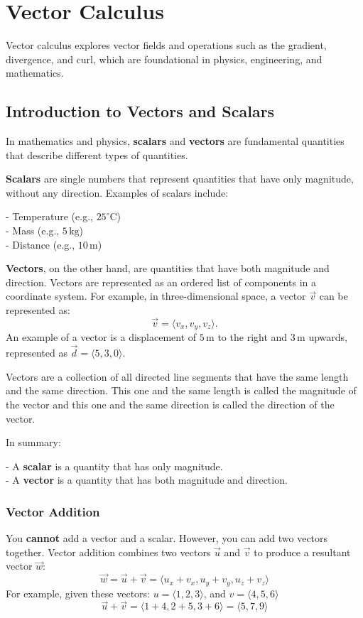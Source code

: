 \documentclass[a4paper,12pt,openany]{book}
\newcommand{\vcomponents}[4]{
    #1 = \langle #2, #3, #4 \rangle
}
\begin{document}
\chapter{Vector Calculus}
Vector calculus explores vector fields and operations such as the gradient, divergence, and curl, which are foundational in physics, engineering, and mathematics.

\section{Introduction to Vectors and Scalars}
In mathematics and physics, \textbf{scalars} and \textbf{vectors} are fundamental quantities that describe different types of quantities.

\textbf{Scalars} are single numbers that represent quantities that have only magnitude, without any direction. Examples of scalars include:

- Temperature (e.g., \(25^\circ \text{C}\))\\
- Mass (e.g., \(5 \, \text{kg}\))\\
- Distance (e.g., \(10 \, \text{m}\))

\textbf{Vectors}, on the other hand, are quantities that have both magnitude and direction. Vectors are represented as an ordered list of components in a coordinate system. For example, in three-dimensional space, a vector \(\vec{v}\) can be represented as:
\[
\vec{v} = \langle v_x, v_y, v_z \rangle.
\]
An example of a vector is a displacement of \(5 \, \text{m}\) to the right and \(3 \, \text{m}\) upwards, represented as \(\vec{d} = \langle 5, 3, 0 \rangle\).


Vectors are a collection of all directed line segments that have the same length and the same direction. This one and the same length is called the magnitude of the vector and this one and the same direction is called the direction of the vector.

In summary:

- A \textbf{scalar} is a quantity that has only magnitude.\\
- A \textbf{vector} is a quantity that has both magnitude and direction.

\subsection{Vector Addition}
You \textbf{cannot} add a vector and a scalar. However, you can add two vectors together. Vector addition combines two vectors \(\vec{u}\) and \(\vec{v}\) to produce a resultant vector \(\vec{w}\):
\[
    \vec{w} = \vec{u} + \vec{v} = \langle u_x + v_x, u_y + v_y, u_z + v_z \rangle
\]
For example, given these vectors: $\vcomponents{u}{1}{2}{3}$, and $\vcomponents{v}{4}{5}{6}$
\[
\vec{u} + \vec{v} = \langle 1 + 4, 2 + 5, 3 + 6 \rangle = \langle 5, 7, 9 \rangle
\]
\end{document}
